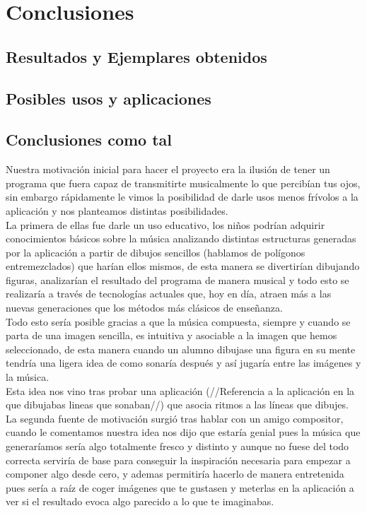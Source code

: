 \chapter{Conclusiones}

\section{Resultados y Ejemplares obtenidos}


\section{Posibles usos y aplicaciones}


\section{Conclusiones como tal}


Nuestra motivación inicial para hacer el proyecto era la ilusión de tener un programa que fuera capaz de transmitirte musicalmente lo que percibían tus ojos, sin embargo rápidamente le vimos la posibilidad de darle usos menos frívolos a la aplicación y nos planteamos distintas posibilidades.
\newline
\\La primera de ellas fue darle un uso educativo, los niños podrían adquirir conocimientos básicos sobre la música analizando distintas estructuras generadas por la aplicación a partir de dibujos sencillos (hablamos de polígonos entremezclados) que harían ellos mismos, de esta manera se divertirían dibujando figuras, analizarían el resultado del programa de manera musical y todo esto se realizaría a través de tecnologías actuales que,  hoy en día, atraen más a las nuevas generaciones que los métodos más clásicos de enseñanza.
\newline
\\Todo esto sería posible gracias a que la música compuesta, siempre y cuando se parta de una imagen sencilla, es intuitiva y asociable a la imagen que hemos seleccionado, de esta manera cuando un alumno dibujase una figura en su mente tendría una ligera idea de como sonaría después y así jugaría entre las imágenes y la música.
\\Esta idea nos vino tras probar una aplicación (//Referencia a la aplicación en la que dibujabas lineas que sonaban//) que asocia ritmos a las líneas que dibujes.
\newline
\\La segunda fuente de motivación surgió tras hablar con un amigo compositor, cuando le comentamos nuestra idea nos dijo que estaría genial pues la música que generaríamos sería algo totalmente fresco y distinto y aunque no fuese del todo correcta serviría de base para conseguir la inspiración necesaria para empezar a componer algo desde cero, y ademas permitiría hacerlo de manera entretenida pues sería  a raíz de coger imágenes que te gustasen y meterlas en la aplicación a ver si el resultado evoca algo parecido a lo que te imaginabas.

